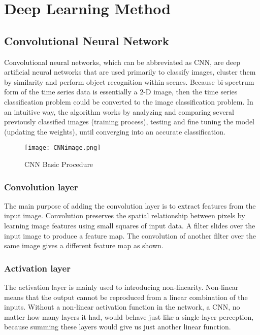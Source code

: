\documentclass[letterpaper,12pt]{article}
\begin{document}
\section{Deep Learning Method}
\label{sec-dnn}
\subsection{Convolutional Neural Network}

Convolutional neural networks, which can be abbreviated as CNN, are deep artificial neural networks that are used primarily to classify images, cluster them by similarity and perform object recognition within scenes. Because bi-spectrum form of the time series data is essentially a 2-D image, then the time series classification problem could be converted to the image classification problem\cite{bagnall16bakeoff}. In an intuitive way, the algorithm works by analyzing and comparing several previously classified images (training process), testing and fine tuning the model (updating the weights), until converging into an accurate classification\cite{wang2017time}.

\begin{figure}[ht] 
\centering \texttt{[image: CNNimage.png]}
\caption{\label{fig:CNNimage}CNN Basic Procedure \cite{karn2016intuitive}}
\end{figure}

\subsubsection{Convolution layer}

The main purpose of adding the convolution layer is to extract features from the input image. Convolution preserves the spatial relationship between pixels by learning image features using small squares of input data. A filter slides over the input image to produce a feature map. The convolution of another filter over the same image gives a different feature map as shown\cite{chollet2015keras}.

\subsubsection{Activation layer}

The activation layer is mainly used to introducing non-linearity. Non-linear means that the output cannot be reproduced from a linear combination of the inputs. Without a non-linear activation function in the network, a CNN, no matter how many layers it had, would behave just like a single-layer perception, because summing these layers would give us just another linear function.
\end{document}
